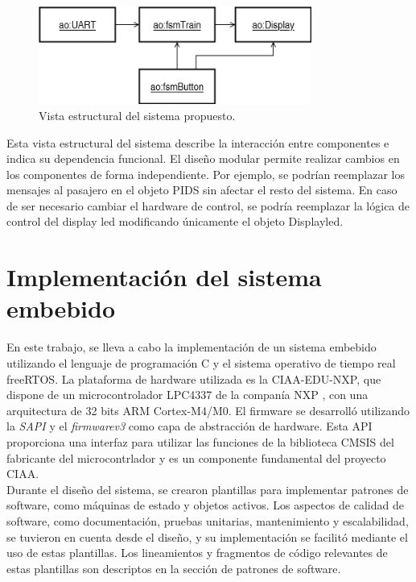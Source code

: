 \begin{figure}[ht]
	\centering
	\includegraphics[width=0.8\textwidth]{./Figures/diagVistaDisenho.png}
	\caption{Vista estructural del sistema propuesto.}
	\label{fig:diagVistaDisenho}
\end{figure}



Esta vista estructural del sistema describe la interacción entre componentes e indica su dependencia funcional. El diseño modular permite realizar cambios en los componentes de forma independiente. Por ejemplo, se podrían reemplazar los mensajes al pasajero en el objeto PIDS sin afectar el resto del sistema. En caso de ser necesario cambiar el hardware de control, se podría reemplazar la lógica de control del display led modificando únicamente el objeto Displayled.\\


\section{Implementación del sistema embebido}

En este trabajo, se lleva a cabo la implementación de un sistema embebido utilizando el lenguaje de programación C y el sistema operativo de tiempo real freeRTOS. La plataforma de hardware utilizada es la CIAA-EDU-NXP, que dispone de un microcontrolador LPC4337 de la companía NXP \citep{NXPLPC4337}, con una arquitectura de 32 bits ARM Cortex-M4/M0. El firmware se desarrolló utilizando la \textit{SAPI} y el \textit{firmwarev3} \citep{firmwarev3} como capa de abstracción de hardware. Esta API proporciona una interfaz para utilizar las funciones de la biblioteca CMSIS del fabricante del microcontrlador y es un componente fundamental del proyecto CIAA.\\
 
Durante el diseño del sistema, se crearon plantillas para implementar patrones de software, como máquinas de estado y objetos activos. Los aspectos de calidad de software, como documentación, pruebas unitarias, mantenimiento y escalabilidad,  se tuvieron en cuenta desde el diseño, y su implementación se facilitó mediante el uso de estas plantillas. Los lineamientos y fragmentos de código relevantes de estas plantillas son descriptos en la sección de patrones de software. \\

